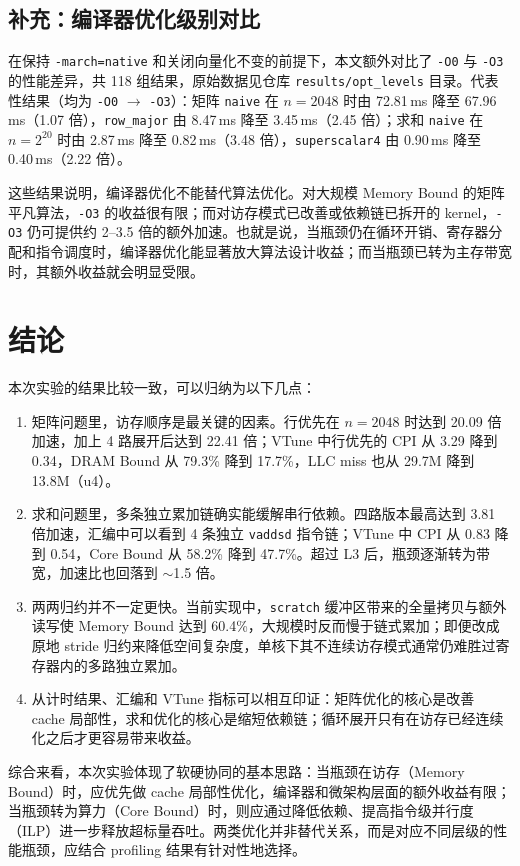 \documentclass[a4paper,11pt,UTF8]{ctexart}
\begin{document}
\subsection{补充：编译器优化级别对比}
在保持 \texttt{-march=native} 和关闭向量化不变的前提下，本文额外对比了 \texttt{-O0} 与 \texttt{-O3} 的性能差异，共 118 组结果，原始数据见仓库 \texttt{results/opt\_levels} 目录。代表性结果（均为 \texttt{-O0} $\to$ \texttt{-O3}）：矩阵 \texttt{naive} 在 $n=2048$ 时由 72.81\,ms 降至 67.96\,ms（1.07 倍），\texttt{row\_major} 由 8.47\,ms 降至 3.45\,ms（2.45 倍）；求和 \texttt{naive} 在 $n=2^{20}$ 时由 2.87\,ms 降至 0.82\,ms（3.48 倍），\texttt{superscalar4} 由 0.90\,ms 降至 0.40\,ms（2.22 倍）。

这些结果说明，编译器优化不能替代算法优化。对大规模 Memory Bound 的矩阵平凡算法，\texttt{-O3} 的收益很有限；而对访存模式已改善或依赖链已拆开的 kernel，\texttt{-O3} 仍可提供约 2--3.5 倍的额外加速。也就是说，当瓶颈仍在循环开销、寄存器分配和指令调度时，编译器优化能显著放大算法设计收益；而当瓶颈已转为主存带宽时，其额外收益就会明显受限。

\section{结论}
本次实验的结果比较一致，可以归纳为以下几点：

\begin{enumerate}
  \item 矩阵问题里，访存顺序是最关键的因素。行优先在 $n=2048$ 时达到 20.09 倍加速，加上 4 路展开后达到 22.41 倍；VTune 中行优先的 CPI 从 3.29 降到 0.34，DRAM Bound 从 79.3\% 降到 17.7\%，LLC miss 也从 29.7M 降到 13.8M（u4）。
  \item 求和问题里，多条独立累加链确实能缓解串行依赖。四路版本最高达到 3.81 倍加速，汇编中可以看到 4 条独立 \texttt{vaddsd} 指令链；VTune 中 CPI 从 0.83 降到 0.54，Core Bound 从 58.2\% 降到 47.7\%。超过 L3 后，瓶颈逐渐转为带宽，加速比也回落到 $\sim$1.5 倍。
  \item 两两归约并不一定更快。当前实现中，\texttt{scratch} 缓冲区带来的全量拷贝与额外读写使 Memory Bound 达到 60.4\%，大规模时反而慢于链式累加；即便改成原地 stride 归约来降低空间复杂度，单核下其不连续访存模式通常仍难胜过寄存器内的多路独立累加。
  \item 从计时结果、汇编和 VTune 指标可以相互印证：矩阵优化的核心是改善 cache 局部性，求和优化的核心是缩短依赖链；循环展开只有在访存已经连续化之后才更容易带来收益。
\end{enumerate}

综合来看，本次实验体现了软硬协同的基本思路：当瓶颈在访存（Memory Bound）时，应优先做 cache 局部性优化，编译器和微架构层面的额外收益有限；当瓶颈转为算力（Core Bound）时，则应通过降低依赖、提高指令级并行度（ILP）进一步释放超标量吞吐。两类优化并非替代关系，而是对应不同层级的性能瓶颈，应结合 profiling 结果有针对性地选择。
\end{document}
